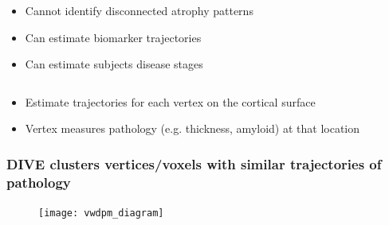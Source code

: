 \documentclass[8pt,xcolor=table]{beamer}
\begin{document}
\begin{frame}
\begin{columns}[T]
\begin{column}{.47\textwidth}
\begin{center}
  \begin{itemize}
   \item Cannot identify disconnected atrophy patterns \no
   \item Can estimate biomarker trajectories \yes
   \item Can estimate subjects disease stages \yes
  \end{itemize}

  
  \end{center}
  \end{column}
\end{columns}

\vspace{1.5em}

\begin{itemize}
  \item Estimate trajectories for each vertex on the cortical surface
  \item Vertex measures pathology (e.g. thickness, amyloid) at that location
\end{itemize}


\end{frame}



\begin{frame}[label=current]
\frametitle{DIVE clusters vertices/voxels with similar trajectories of pathology}

\begin{figure}
\centering
\texttt{[image: vwdpm\_diagram]}
\end{figure}

    
\end{frame}
\end{document}
